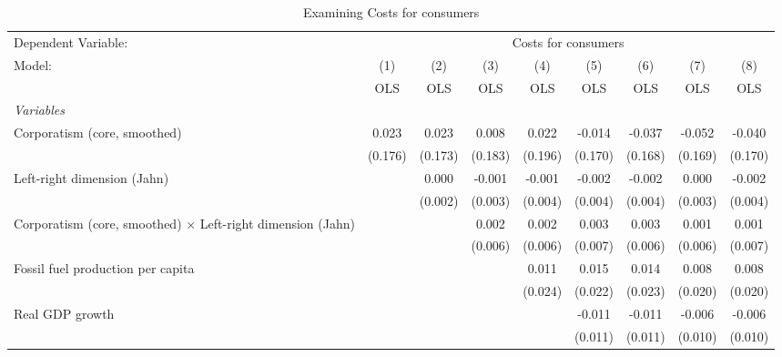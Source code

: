 
\begin{table}[htbp]
   \caption{Examining Costs for consumers}
   \centering
   \begin{tabular}{lcccccccc}
      \toprule
      Dependent Variable: & \multicolumn{8}{c}{Costs for consumers}\\
      Model:                                                             & (1)     & (2)     & (3)     & (4)     & (5)     & (6)     & (7)     & (8)\\  
                                                                         &  OLS    & OLS     & OLS     & OLS     & OLS     & OLS     & OLS     & OLS\\  
      \midrule
      \emph{Variables}\\
      Corporatism (core, smoothed)                                       & 0.023   & 0.023   & 0.008   & 0.022   & -0.014  & -0.037  & -0.052  & -0.040\\   
                                                                         & (0.176) & (0.173) & (0.183) & (0.196) & (0.170) & (0.168) & (0.169) & (0.170)\\   
      Left-right dimension (Jahn)                                        &         & 0.000   & -0.001  & -0.001  & -0.002  & -0.002  & 0.000   & -0.002\\   
                                                                         &         & (0.002) & (0.003) & (0.004) & (0.004) & (0.004) & (0.003) & (0.004)\\   
      Corporatism (core, smoothed) $\times$ Left-right dimension (Jahn)  &         &         & 0.002   & 0.002   & 0.003   & 0.003   & 0.001   & 0.001\\   
                                                                         &         &         & (0.006) & (0.006) & (0.007) & (0.006) & (0.006) & (0.007)\\   
      Fossil fuel production per capita                                  &         &         &         & 0.011   & 0.015   & 0.014   & 0.008   & 0.008\\   
                                                                         &         &         &         & (0.024) & (0.022) & (0.023) & (0.020) & (0.020)\\   
      Real GDP growth                                                    &         &         &         &         & -0.011  & -0.011  & -0.006  & -0.006\\   
                                                                         &         &         &         &         & (0.011) & (0.011) & (0.010) & (0.010)\\   

\end{tabular}
\end{table}

